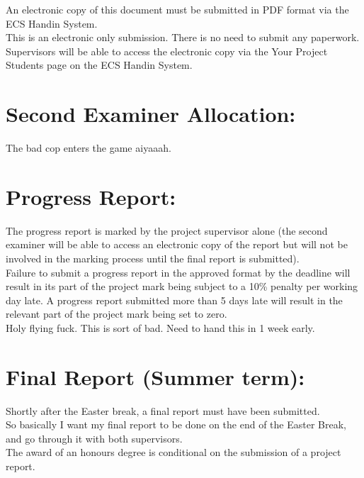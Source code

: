 \documentclass [12pt]{article}
\begin{document}
An electronic copy of this document must be submitted in PDF format via the ECS Handin System.\\

This is an electronic only submission. There is no need to submit any paperwork.\\

Supervisors will be able to access the electronic copy via the Your Project Students page on the ECS Handin System. \\

\section{Second Examiner Allocation:}

The bad cop enters the game aiyaaah.\\ 

\section{Progress Report:}

The progress report is marked by the project supervisor alone (the second examiner will be able to access an electronic copy of the report but will not be involved in the marking process until the final report is submitted). \\

Failure to submit a progress report in the approved format by the deadline will result in its part of the project mark being subject to a 10\% penalty per working day late. A progress report submitted more than 5 days late will result in the relevant part of the project mark being set to zero.\\

Holy flying fuck. This is sort of bad. Need to hand this in 1 week early.\\  

\section{Final Report (Summer term):}


Shortly after the Easter break, a final report must have been submitted.\\ 
So basically I want my final report to be done on the end of the Easter Break, and go through it with both supervisors.\\ 

The award of an honours degree is conditional on the submission of a project report. \\
\end{document}
